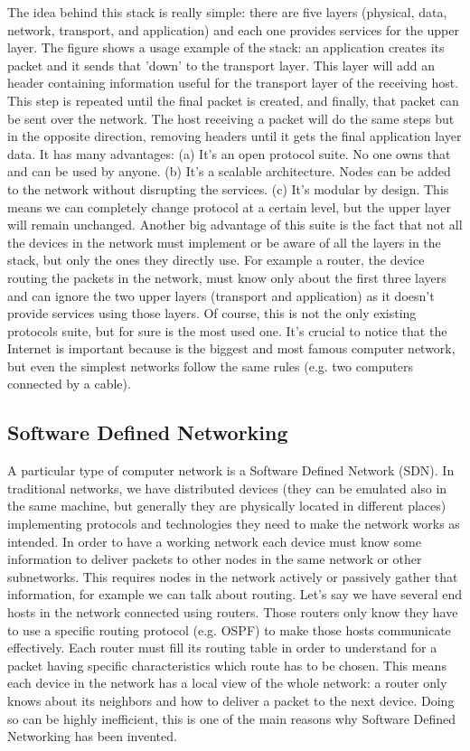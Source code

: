 The idea behind this stack is really simple: there are five layers (physical, data, network, transport, and application) and each one provides services for the upper layer. The figure shows a usage example of the stack: an application creates its packet and it sends that 'down' to the transport layer. This layer will add an header containing information useful for the transport layer of the receiving host. This step is repeated until the final packet is created, and finally, that packet can be sent over the network. The host receiving a packet will do the same steps but in the opposite direction, removing headers until it gets the final application layer data. It has many advantages: (a) It's an open protocol suite. No one owns that and can be used by anyone. (b) It's a scalable architecture. Nodes can be added to the network without disrupting the services. (c) It's modular by design. This means we can completely change protocol at a certain level, but the upper layer will remain unchanged. Another big advantage of this suite is the fact that not all the devices in the network must implement or be aware of all the layers in the stack, but only the ones they directly use. For example a router, the device routing the packets in the network, must know only about the first three layers and can ignore the two upper layers (transport and application) as it doesn't provide services using those layers. Of course, this is not the only existing protocols suite, but for sure is the most used one. It's crucial to notice that the Internet is important because is the biggest and most famous computer network, but even the simplest networks follow the same rules (e.g. two computers connected by a cable).

\subsection{Software Defined Networking}

A particular type of computer network is a Software Defined Network (SDN). In traditional networks, we have distributed devices (they can be emulated also in the same machine, but generally they are physically located in different places) implementing protocols and technologies they need to make the network works as intended. In order to have a working network each device must know some information to deliver packets to other nodes in the same network or other subnetworks. This requires nodes in the network actively or passively gather that information, for example we can talk about routing. Let's say we have several end hosts in the network connected using routers. Those routers only know they have to use a specific routing protocol (e.g. OSPF) to make those hosts communicate effectively. Each router must fill its routing table in order to understand for a packet having specific characteristics which route has to be chosen. This means each device in the network has a local view of the whole network: a router only knows about its neighbors and how to deliver a packet to the next device. Doing so can be highly inefficient, this is one of the main reasons why Software Defined Networking has been invented.
 
